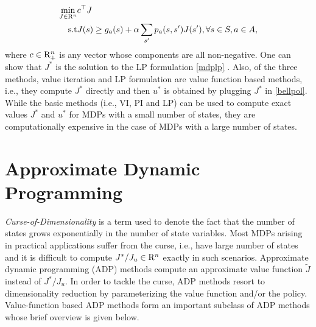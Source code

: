 \documentclass[12pt,draftcls,onecolumn]{IEEEtran}
\begin{document}
\small
\begin{align}\label{mdplp}
\min_{J\in \R^n} &c^\top J\nn\\
\text{s.t}\mb &J(s)\geq g_a(s)+\alpha\sum_{s'}p_a(s,s')J(s'), \mb\forall s\in S, a \in A,
\end{align}
\normalsize
where $c\in \mathrm{R}^n_+$ is any vector whose components are all non-negative. One can show that $J^*$ is the solution to the LP formulation \eqref{mdplp} \cite{BertB}. 
Also, of the three methods, value iteration and LP formulation are value function based methods, i.e., they compute $J^*$ directly and then $u^*$ is obtained by plugging $J^*$ in \eqref{bellpol}.\\
While the basic methods (i.e., VI, PI and LP) can be used to compute exact values $J^*$ and $u^*$ for MDPs with a small number of states, they are computationally expensive in the case of MDPs with a large number of states.
\section{Approximate Dynamic Programming}
\emph{Curse-of-Dimensionality} is a term used to denote the fact that the number of states grows exponentially in the number of state variables. Most MDPs arising in practical applications suffer from the curse, i.e., have large number of states and it is difficult to compute $J^*/J_u\in \mathrm{R}^n$ exactly in such scenarios. Approximate dynamic programming (ADP) \cite{lspi,lspe,ALP,wang2014approximate} methods compute an approximate value function $\tilde{J}$ instead of $J^*/J_u$. In order to tackle the curse, ADP methods resort to dimensionality reduction by parameterizing the value function and/or the policy. Value-function based ADP methods form an important subclass of ADP methods whose brief overview is given below.
\end{document}
